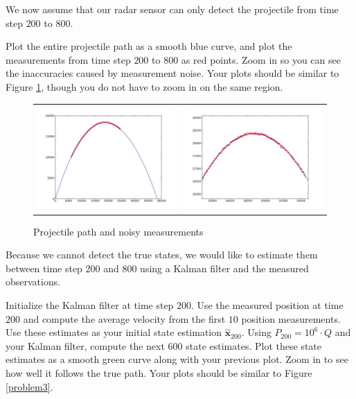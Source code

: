 We now assume that our radar sensor can only detect the projectile from time step $200$ to $800$.

\begin{problem}
Plot the entire projectile path as a smooth blue curve, and plot the measurements from time step $200$ to $800$ as red points. Zoom in so you can see the inaccuracies caused by measurement noise. Your plots should be similar to Figure \ref{problem2}, though you do not have to zoom in on the same region.
\end{problem}

\begin{figure}\label{problem2}
	\centering
	\begin{tabular}{cc} \includegraphics[width=6cm]{problem2_1.jpg} & \includegraphics[width=6cm]{problem2_2.jpg}
	\end{tabular}
	\caption{Projectile path and noisy measurements}
\end{figure}

Because we cannot detect the true states, we would like to estimate them between time step $200$ and $800$ using a Kalman filter and the measured observations.

\begin{problem}
Initialize the Kalman filter at time step $200$. Use the measured position at time $200$ and compute the average velocity from the first $10$ position measurements. Use these estimates as your initial state estimation $\widehat{\mathbf{x}}_{200}$. Using $P_{200} = 10^{6} \cdot Q$ and your Kalman filter, compute the next $600$ state estimates. Plot these state estimates as a smooth green curve along with your previous plot. Zoom in to see how well it follows the true path. Your plots should be similar to Figure \ref{problem3}.
\end{problem}

